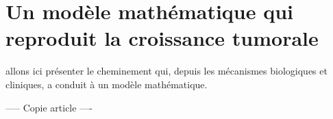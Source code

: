 \documentclass[main.tex]{subfiles}
\begin{document}
\chapter{Un modèle mathématique qui reproduit la croissance tumorale}

 allons ici présenter le cheminement qui, depuis les mécanismes biologiques et cliniques, a conduit à un modèle mathématique. 

\begin{center}
----- Copie article ----
\end{center}
\end{document}
